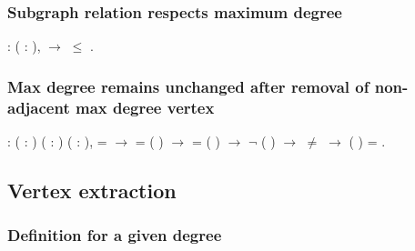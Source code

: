 \subsubsection{Subgraph relation respects maximum degree}


\begin{coqdoccode}
\coqdocemptyline
\coqdocnoindent
{}  : \coqdockw{\ensuremath{\forall}} (  : ),    \ensuremath{\rightarrow}   \ensuremath{\le}  .\coqdoceol
\coqdocemptyline
\end{coqdoccode}
\subsubsection{Max degree remains unchanged after removal of non-adjacent max degree vertex}


\begin{coqdoccode}
\coqdocnoindent
{}  :\coqdoceol
\coqdocindent{1.00em}
\coqdockw{\ensuremath{\forall}} ( : ) ( : ) (  : ),\coqdoceol
\coqdocindent{2.00em}
  =   \ensuremath{\rightarrow}\coqdoceol
\coqdocindent{2.00em}
   =  ( ) \ensuremath{\rightarrow}\coqdoceol
\coqdocindent{2.00em}
   =  ( ) \ensuremath{\rightarrow}\coqdoceol
\coqdocindent{2.00em}
\ensuremath{\lnot}   (  ) \ensuremath{\rightarrow}\coqdoceol
\coqdocindent{2.00em}
 \ensuremath{\not=}  \ensuremath{\rightarrow}\coqdoceol
\coqdocindent{2.00em}
 (  ) =  .\coqdoceol
\coqdocemptyline
\end{coqdoccode}
\subsection{Vertex extraction}

\subsubsection{Definition for a given degree}


